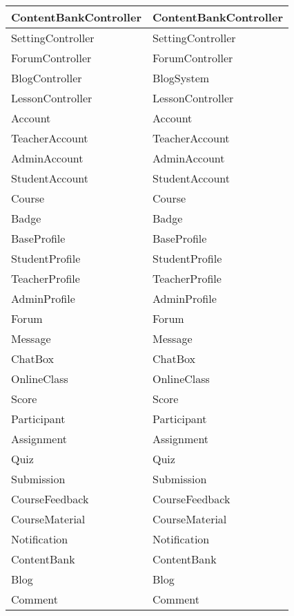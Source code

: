 \documentclass[./../main_file.tex]{subfiles}
\begin{document}
\begin{longtable}{|p{.5\linewidth}|p{.5\linewidth}|}
		ContentBankController      & ContentBankController    \\ \hline
		SettingController          & SettingController        \\ \hline
		ForumController            & ForumController          \\ \hline
		BlogController             & BlogSystem               \\ \hline
		LessonController           & LessonController         \\ \hline
		Account                    & Account                  \\ \hline
		TeacherAccount             & TeacherAccount           \\ \hline
		AdminAccount               & AdminAccount             \\ \hline
		StudentAccount             & StudentAccount           \\ \hline
		Course                     & Course                   \\ \hline
		Badge                      & Badge                    \\ \hline
		BaseProfile                & BaseProfile              \\ \hline
		StudentProfile             & StudentProfile           \\ \hline
		TeacherProfile             & TeacherProfile           \\ \hline
		AdminProfile               & AdminProfile             \\ \hline
		Forum                      & Forum                    \\ \hline
		Message                    & Message                  \\ \hline
		ChatBox                    & ChatBox                  \\ \hline
		OnlineClass                & OnlineClass              \\ \hline
		Score                      & Score                    \\ \hline
		Participant                & Participant              \\ \hline
		Assignment                 & Assignment               \\ \hline
		Quiz                       & Quiz                     \\ \hline
		Submission                 & Submission               \\ \hline
		CourseFeedback             & CourseFeedback           \\ \hline
		CourseMaterial             & CourseMaterial           \\ \hline
		Notification               & Notification             \\ \hline
		ContentBank                & ContentBank              \\ \hline
		Blog                       & Blog                     \\ \hline
		Comment                    & Comment                  \\ \hline
	\end{longtable}
\end{document}
